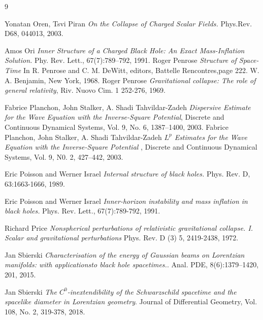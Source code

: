 \documentclass[10pt,a4paper]{article}
\theoremstyle{plain}
\theoremstyle{remark}
\theoremstyle{definition}
\theoremstyle{plain}
\theoremstyle{remark}
\theoremstyle{definition}
\numberwithin{equation}{section}
\begin{document}
\begin{thebibliography}{9}
	
	Yonatan Oren, Tsvi Piran \emph{On the Collapse of Charged Scalar Fields.} Phys.Rev. D68, 044013, 2003. 
	
	Amos Ori \emph{Inner Structure of a Charged Black Hole: An Exact Mass-Inflation Solution.} Phy. Rev. Lett., 67(7):789–792, 1991.
	 Roger Penrose \emph{Structure of Space-Time} In R. Penrose and C. M. DeWitt, editors, Battelle  Rencontres,page 222. W. A. Benjamin, New York, 1968.
	 Roger Penrose \emph{Gravitational collapse: The role of general relativity}, Riv. Nuovo Cim. 1  252-276, 1969. 
	
	  Fabrice Planchon, John Stalker, A. Shadi Tahvildar-Zadeh \emph{Dispersive Estimate for the Wave Equation with the Inverse-Square Potential}, Discrete and Continuous Dynamical Systems, Vol. 9, No. 6, 1387--1400, 2003.
	 Fabrice Planchon, John Stalker, A. Shadi Tahvildar-Zadeh \emph{$L^p$ Estimates for the Wave Equation with the Inverse-Square Potential} , Discrete and Continuous Dynamical Systems, Vol. 9, N0. 2, 427--442, 2003.
	
	
	
	
	
	
	
	
	
	
	Eric Poisson and Werner Israel \emph{Internal structure of black holes.	}
	Phys. Rev. D,  63:1663-1666, 1989.
	
	Eric Poisson and Werner Israel \emph{Inner-horizon instability and mass inflation in black holes.}
	Phys. Rev. Lett., 67(7):789-792, 1991.
	
	Richard Price
	\emph{Nonspherical perturbations of relativistic gravitational collapse. I. Scalar and gravitational perturbations}
	Phys. Rev. D (3)
	5, 2419-2438, 1972.
	
	
	
	
	
	
	Jan Sbierski \emph{Characterisation of the energy of Gaussian beams on Lorentzian manifolds: with applicationsto black hole spacetimes.}. Anal. PDE, 8(6):1379–1420, 201, 2015.
	
	
	
	Jan Sbierski \emph{The $C^0$-inextendibility of the Schwarzschild spacetime and the
		spacelike diameter in Lorentzian geometry}. Journal of Differential Geometry, Vol. 108, No. 2, 319-378, 2018.
	

\end{thebibliography}
\end{document}
